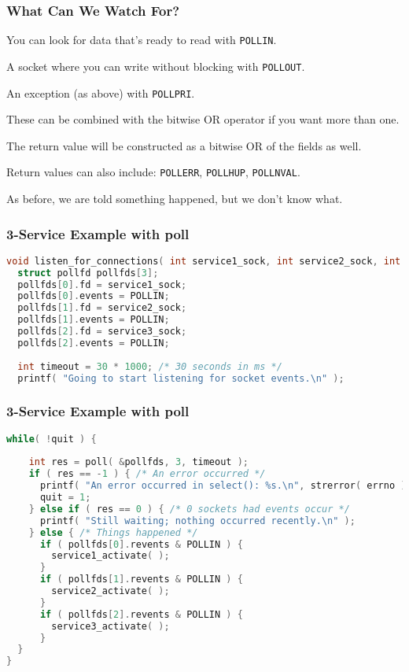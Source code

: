\begin{frame}
	\frametitle{What Can We Watch For?}

	You can look for data that's ready to read with \texttt{POLLIN}.

	A socket where you can write without blocking with \texttt{POLLOUT}.

	An exception (as above) with \texttt{POLLPRI}.

	These can be combined with the bitwise OR operator if you want more than one.

	The return value will be constructed as a bitwise OR of the fields as well.

	Return values can also include: \texttt{POLLERR}, \texttt{POLLHUP}, \texttt{POLLNVAL}.

	As before, we are told something happened, but we don't know what.

\end{frame}


\begin{frame}[fragile]
	\frametitle{3-Service Example with poll}
	\begin{lstlisting}[language=C]
void listen_for_connections( int service1_sock, int service2_sock, int service3_sock ) {
  struct pollfd pollfds[3];
  pollfds[0].fd = service1_sock;
  pollfds[0].events = POLLIN;
  pollfds[1].fd = service2_sock;
  pollfds[1].events = POLLIN;
  pollfds[2].fd = service3_sock;
  pollfds[2].events = POLLIN;
 
  int timeout = 30 * 1000; /* 30 seconds in ms */ 
  printf( "Going to start listening for socket events.\n" );
\end{lstlisting}

\end{frame}

\begin{frame}[fragile]
	\frametitle{3-Service Example with poll}
	\begin{lstlisting}[language=C]
  while( !quit ) {
    
    int res = poll( &pollfds, 3, timeout );
    if ( res == -1 ) { /* An error occurred */
      printf( "An error occurred in select(): %s.\n", strerror( errno ) );
      quit = 1;
    } else if ( res == 0 ) { /* 0 sockets had events occur */
      printf( "Still waiting; nothing occurred recently.\n" );
    } else { /* Things happened */
      if ( pollfds[0].revents & POLLIN ) {
        service1_activate( ); 
      }
      if ( pollfds[1].revents & POLLIN ) {
        service2_activate( ); 
      }
      if ( pollfds[2].revents & POLLIN ) {
        service3_activate( ); 
      }
  }
}
\end{lstlisting}

\end{frame}


